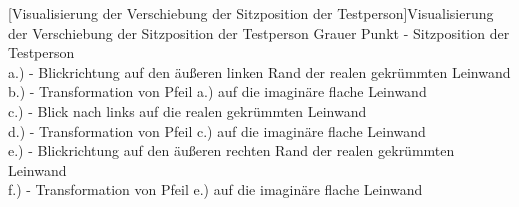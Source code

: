 \begin{center}
\begin{tikzpicture}
	\end{tikzpicture}
	[Visualisierung der Verschiebung der Sitzposition der Testperson]{Visualisierung der Verschiebung der Sitzposition der Testperson}
	\captionsetup{justification=justified, singlelinecheck=false}
	{\footnotesize Grauer Punkt - Sitzposition der Testperson\\
	a.) - Blickrichtung auf den äußeren linken Rand der realen gekrümmten Leinwand\\
	b.) - Transformation von Pfeil a.) auf die imaginäre flache Leinwand\\
	c.) - Blick nach links auf die realen gekrümmten Leinwand\\
	d.) - Transformation von Pfeil c.) auf die imaginäre flache Leinwand\\
	e.) - Blickrichtung auf den äußeren rechten Rand der realen gekrümmten Leinwand\\
	f.) - Transformation von Pfeil e.) auf die imaginäre flache Leinwand} \label{fig:kruemmungsproblem_3}
\end{center}

